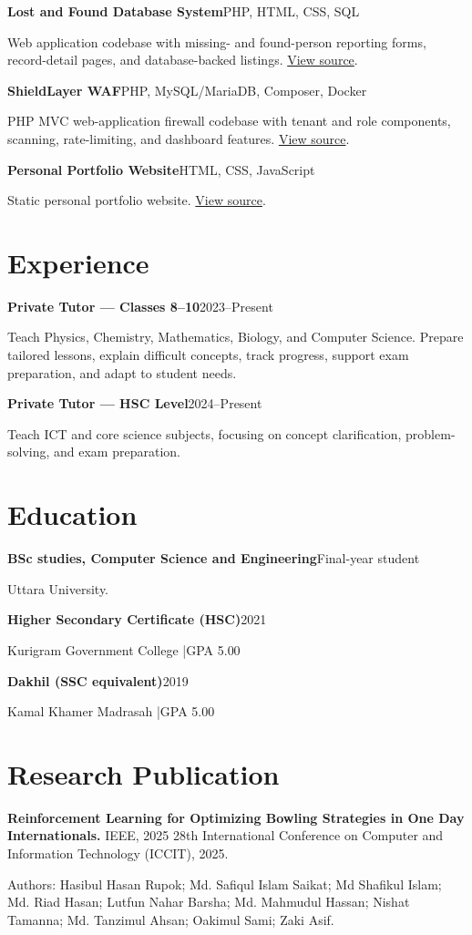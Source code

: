 \documentclass[10pt,a4paper]{article}
\newcommand{\entry}[2]{%
  \textbf{#1}\hfill{\small\color{muted}#2}\par
}
\begin{document}
\entry{Lost and Found Database System}{PHP, HTML, CSS, SQL}
Web application codebase with missing- and found-person reporting forms,
record-detail pages, and database-backed listings.
\href{https://github.com/mhasnx/lost-and-found-database-}{View source}.

\entry{ShieldLayer WAF}{PHP, MySQL/MariaDB, Composer, Docker}
PHP MVC web-application firewall codebase with tenant and role components,
scanning, rate-limiting, and dashboard features.
\href{https://github.com/mhasnx/shieldlayer-waf}{View source}.

\entry{Personal Portfolio Website}{HTML, CSS, JavaScript}
Static personal portfolio website.
\href{https://github.com/mhasnx/basicdv}{View source}.

\section*{Experience}
\entry{Private Tutor --- Classes 8--10}{2023--Present}
Teach Physics, Chemistry, Mathematics, Biology, and Computer Science. Prepare
tailored lessons, explain difficult concepts, track progress, support exam
preparation, and adapt to student needs.

\entry{Private Tutor --- HSC Level}{2024--Present}
Teach ICT and core science subjects, focusing on concept clarification,
problem-solving, and exam preparation.

\section*{Education}
\entry{BSc studies, Computer Science and Engineering}{Final-year student}
Uttara University.

\entry{Higher Secondary Certificate (HSC)}{2021}
Kurigram Government College \enspace|\enspace GPA 5.00

\entry{Dakhil (SSC equivalent)}{2019}
Kamal Khamer Madrasah \enspace|\enspace GPA 5.00

\section*{Research Publication}
\textbf{Reinforcement Learning for Optimizing Bowling Strategies in One Day
Internationals.} IEEE, 2025 28th International Conference on Computer and
Information Technology (ICCIT), 2025.

\small
Authors: Hasibul Hasan Rupok; Md. Safiqul Islam Saikat; Md Shafikul Islam;
Md. Riad Hasan; Lutfun Nahar Barsha; Md. Mahmudul Hassan; Nishat Tamanna;
Md. Tanzimul Ahsan; Oakimul Sami; Zaki Asif.
\normalsize
\end{document}
